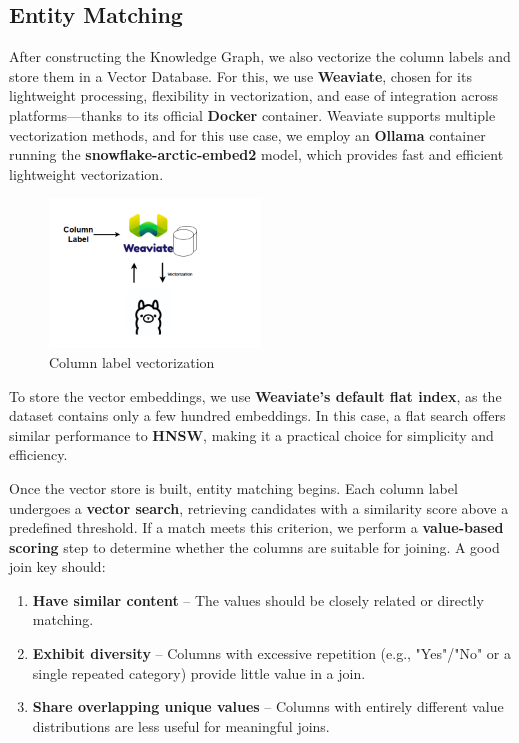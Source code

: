 \subsection{Entity Matching}
After constructing the Knowledge Graph, we also vectorize the column labels and store them in a Vector Database. For this, we use \textbf{Weaviate}, chosen for its lightweight processing, flexibility in vectorization, and ease of integration across platforms—thanks to its official \textbf{Docker} container. Weaviate supports multiple vectorization methods, and for this use case, we employ an \textbf{Ollama} container running the \textbf{snowflake-arctic-embed2} model, which provides fast and efficient lightweight vectorization.
\begin{figure}[h]
    \centering
\includegraphics[width=0.5\textwidth]{IMAGES/immagine_2025-03-27_153710010.png}
    \caption{Column label vectorization}
    \label{fig:Vectorization}
\end{figure}
To store the vector embeddings, we use \textbf{Weaviate’s default flat index}, as the dataset contains only a few hundred embeddings. In this case, a flat search offers similar performance to \textbf{HNSW}, making it a practical choice for simplicity and efficiency.

Once the vector store is built, entity matching begins. Each column label undergoes a \textbf{vector search}, retrieving candidates with a similarity score above a predefined threshold. If a match meets this criterion, we perform a \textbf{value-based scoring} step to determine whether the columns are suitable for joining. A good join key should:

\begin{enumerate}
    \item \textbf{Have similar content} – The values should be closely related or directly matching.
    \item \textbf{Exhibit diversity} – Columns with excessive repetition (e.g., "Yes"/"No" or a single repeated category) provide little value in a join.
    \item \textbf{Share overlapping unique values} – Columns with entirely different value distributions are less useful for meaningful joins.
\end{enumerate}


